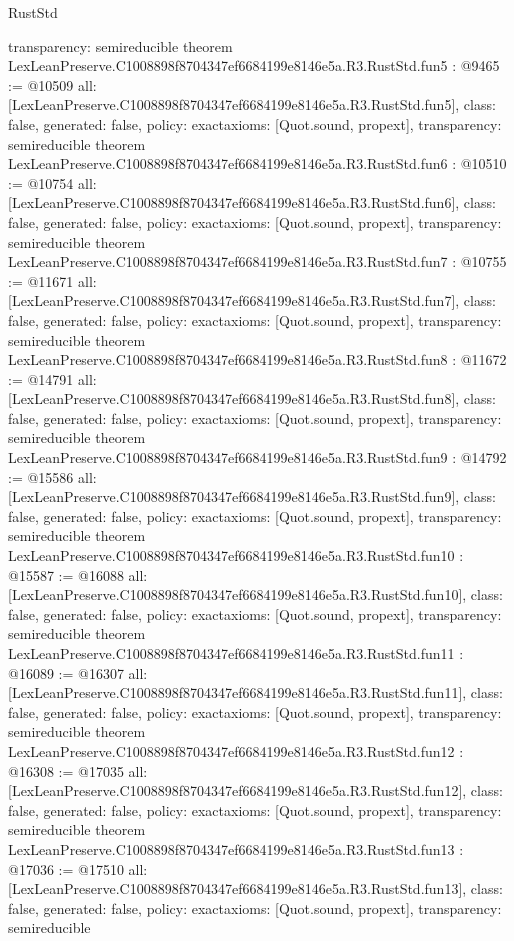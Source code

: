 \begin{lexlean}{RustStd}
\begin{coremodule}
{  transparency: semireducible
}
theorem LexLeanPreserve.C1008898f8704347ef6684199e8146e5a.R3.RustStd.fun5 : @9465 := @10509 {
  all: [LexLeanPreserve.C1008898f8704347ef6684199e8146e5a.R3.RustStd.fun5],
  class: false,
  generated: false,
  policy: exact{axioms: [Quot.sound, propext]},
  transparency: semireducible
}
theorem LexLeanPreserve.C1008898f8704347ef6684199e8146e5a.R3.RustStd.fun6 : @10510 := @10754 {
  all: [LexLeanPreserve.C1008898f8704347ef6684199e8146e5a.R3.RustStd.fun6],
  class: false,
  generated: false,
  policy: exact{axioms: [Quot.sound, propext]},
  transparency: semireducible
}
theorem LexLeanPreserve.C1008898f8704347ef6684199e8146e5a.R3.RustStd.fun7 : @10755 := @11671 {
  all: [LexLeanPreserve.C1008898f8704347ef6684199e8146e5a.R3.RustStd.fun7],
  class: false,
  generated: false,
  policy: exact{axioms: [Quot.sound, propext]},
  transparency: semireducible
}
theorem LexLeanPreserve.C1008898f8704347ef6684199e8146e5a.R3.RustStd.fun8 : @11672 := @14791 {
  all: [LexLeanPreserve.C1008898f8704347ef6684199e8146e5a.R3.RustStd.fun8],
  class: false,
  generated: false,
  policy: exact{axioms: [Quot.sound, propext]},
  transparency: semireducible
}
theorem LexLeanPreserve.C1008898f8704347ef6684199e8146e5a.R3.RustStd.fun9 : @14792 := @15586 {
  all: [LexLeanPreserve.C1008898f8704347ef6684199e8146e5a.R3.RustStd.fun9],
  class: false,
  generated: false,
  policy: exact{axioms: [Quot.sound, propext]},
  transparency: semireducible
}
theorem LexLeanPreserve.C1008898f8704347ef6684199e8146e5a.R3.RustStd.fun10 : @15587 := @16088 {
  all: [LexLeanPreserve.C1008898f8704347ef6684199e8146e5a.R3.RustStd.fun10],
  class: false,
  generated: false,
  policy: exact{axioms: [Quot.sound, propext]},
  transparency: semireducible
}
theorem LexLeanPreserve.C1008898f8704347ef6684199e8146e5a.R3.RustStd.fun11 : @16089 := @16307 {
  all: [LexLeanPreserve.C1008898f8704347ef6684199e8146e5a.R3.RustStd.fun11],
  class: false,
  generated: false,
  policy: exact{axioms: [Quot.sound, propext]},
  transparency: semireducible
}
theorem LexLeanPreserve.C1008898f8704347ef6684199e8146e5a.R3.RustStd.fun12 : @16308 := @17035 {
  all: [LexLeanPreserve.C1008898f8704347ef6684199e8146e5a.R3.RustStd.fun12],
  class: false,
  generated: false,
  policy: exact{axioms: [Quot.sound, propext]},
  transparency: semireducible
}
theorem LexLeanPreserve.C1008898f8704347ef6684199e8146e5a.R3.RustStd.fun13 : @17036 := @17510 {
  all: [LexLeanPreserve.C1008898f8704347ef6684199e8146e5a.R3.RustStd.fun13],
  class: false,
  generated: false,
  policy: exact{axioms: [Quot.sound, propext]},
  transparency: semireducible
}
\end{coremodule}
\end{lexlean}

